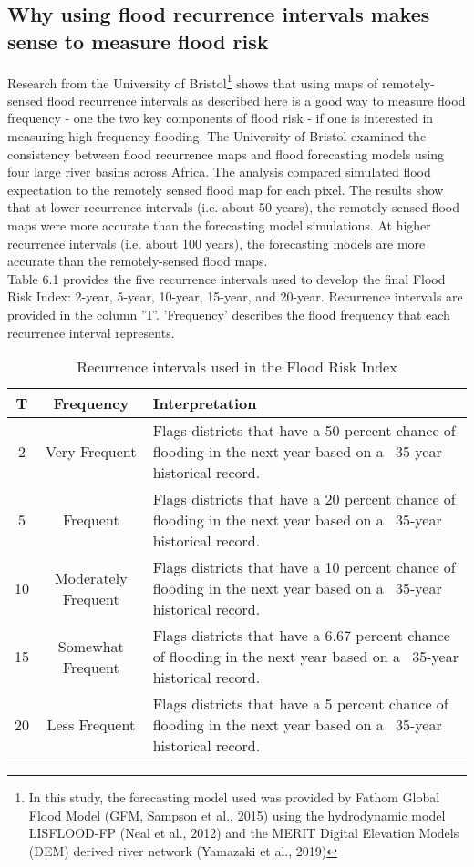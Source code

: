 \subsection{Why using flood recurrence intervals makes sense to measure flood risk}

Research from the University of Bristol\footnote{In this study, the forecasting model used was provided by Fathom Global Flood Model (GFM, Sampson et al., 2015\cite{sampson2015high}) using the hydrodynamic model LISFLOOD-FP (Neal et al., 2012) and the MERIT Digital Elevation Models (DEM) derived river network (Yamazaki et al., 2019\cite{yamazaki2019merit})} shows that using maps of remotely-sensed flood recurrence intervals as described here is a good way to measure flood frequency - one the two key components of flood risk - if one is interested in measuring high-frequency flooding. The University of Bristol examined the consistency between flood recurrence maps and flood forecasting models using four large river basins across Africa. The analysis compared simulated flood expectation to the remotely sensed flood map for each pixel. The results show that at lower recurrence intervals (i.e. about 50 years), the remotely-sensed flood maps were more accurate than the forecasting model simulations. At higher recurrence intervals (i.e. about 100 years), the forecasting models are more accurate than the remotely-sensed flood maps.\\

Table 6.1 provides the five recurrence intervals used to develop the final Flood Risk Index: 2-year, 5-year, 10-year, 15-year, and 20-year. Recurrence intervals are provided in the column 'T'. 'Frequency' describes the flood frequency that each recurrence interval represents.

\begin{table}
\centering
\begin{tabular}{|c|c|p{10cm}|}
\hline
\textbf{T} & \textbf{Frequency} & \textbf{Interpretation}\\
\hline
2\rule{0pt}{4ex} & Very Frequent & Flags districts that have a 50 percent chance of flooding in the next year based on a ~35-year historical record. \\
5\rule{0pt}{4ex} & Frequent & Flags districts that have a 20 percent chance of flooding in the next year based on a ~35-year historical record. \\
10\rule{0pt}{4ex} & Moderately Frequent & Flags districts that have a 10 percent chance of flooding in the next year based on a ~35-year historical  record. \\
15\rule{0pt}{4ex} & Somewhat Frequent & Flags districts that have a 6.67 percent chance of flooding in the next year based on a ~35-year historical  record. \\
20\rule{0pt}{4ex} & Less Frequent & Flags districts that have a 5 percent chance of flooding in the next year based on a ~35-year historical record.\\
\hline
\end{tabular}
\caption{Recurrence intervals used in the Flood Risk Index}
\end{table}


